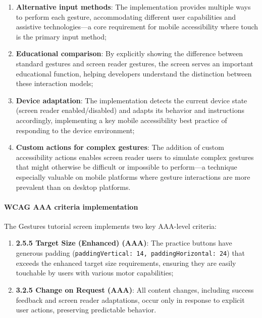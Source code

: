 \begin{enumerate}
    \item \textbf{Alternative input methods}: The implementation provides multiple ways to perform each gesture, accommodating different user capabilities and assistive technologies—a core requirement for mobile accessibility where touch is the primary input method;
    
    \item \textbf{Educational comparison}: By explicitly showing the difference between standard gestures and screen reader gestures, the screen serves an important educational function, helping developers understand the distinction between these interaction models;
    
    \item \textbf{Device adaptation}: The implementation detects the current device state (screen reader enabled/disabled) and adapts its behavior and instructions accordingly, implementing a key mobile accessibility best practice of responding to the device environment;
    
    \item \textbf{Custom actions for complex gestures}: The addition of custom accessibility actions enables screen reader users to simulate complex gestures that might otherwise be difficult or impossible to perform—a technique especially valuable on mobile platforms where gesture interactions are more prevalent than on desktop platforms.
\end{enumerate}

\paragraph{WCAG AAA criteria implementation}

The Gestures tutorial screen implements two key AAA-level criteria:

\begin{enumerate}
    \item \textbf{2.5.5 Target Size (Enhanced) (AAA)}: The practice buttons have generous padding (\texttt{paddingVertical: 14, paddingHorizontal: 24}) that exceeds the enhanced target size requirements, ensuring they are easily touchable by users with various motor capabilities;
    
    \item \textbf{3.2.5 Change on Request (AAA)}: All content changes, including success feedback and screen reader adaptations, occur only in response to explicit user actions, preserving predictable behavior.
\end{enumerate}

